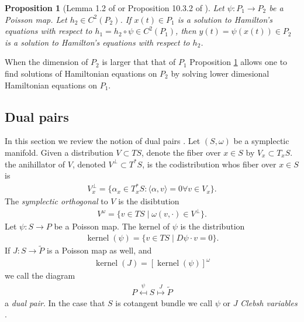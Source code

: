 \documentclass[12pt]{amsart}
\newtheorem{prop}[thm]{Proposition}
\DeclareMathOperator{\kernel}{kernel}
\begin{document}
\begin{prop}[Lemma 1.2 of \cite{Weinstein1983} or Proposition 10.3.2 of \cite{MandS}] \label{prop:Poisson_dynamics}
  Let $\psi:P_1 \to P_2$ be a Poisson map.
  Let $h_2 \in C^2(P_2)$.
  If $x(t) \in P_1$ is a solution to Hamilton's equations with respect
  to $h_1 = h_2 \circ \psi \in C^2(P_1)$, then $y(t) = \psi(x(t)) \in P_2$ is a solution
  to Hamilton's equations with respect to $h_2$.
\end{prop}

  When the dimension of $P_2$ is larger that that of $P_1$
  Proposition \ref{prop:Poisson_dynamics} allows one to find solutions of
  Hamiltonian equations on $P_2$
  by solving lower dimesional Hamiltonian equations
  on $P_1$.
  \subsection{Dual pairs}
  In this section we review the notion of dual pairs
  \cite{MarsdenWeinstein1983,Weinstein1983,Gay-BalmazVizman2011}.
  Let $(S,\omega)$ be a symplectic manifold.
  Given a distribution $V \subset TS$, denote the fiber over 
  $x \in S$ by $V_x \subset T_x S$.
  the anihillator of $V$, denoted $V^\perp \subset T^*S$, is the
  codistribution whos fiber over $x \in S$ is
  \begin{align*}
    V_x^\perp = \{ \alpha_x \in T_x^*S : \langle \alpha , v \rangle = 0 \forall v \in V_x  \}.
  \end{align*}
  The \emph{symplectic orthogonal} to $V$ is the disibtution
  \begin{align*}
    V^\omega = \{ v \in TS \mid \omega( v , \cdot ) \in V^\perp \}.
  \end{align*}
  Let $\psi:S \to P$ be a Poisson map.
  The kernel of $\psi$ is the distribution
  \begin{align*}
    \kernel(\psi) = \{ v \in TS \mid D\psi \cdot v  = 0 \}.
  \end{align*}
  If $J:S \to \tilde{P}$ is a Poisson map as well, and
  \begin{align*}
    \kernel(J) =  [\kernel(\psi) ]^\omega
  \end{align*}
  we call the diagram
  \begin{align*}
    P \stackrel{\psi}{\mapsfrom} S \stackrel{J}{\mapsto} \tilde{P}
  \end{align*}
  a \emph{dual pair}.
  In the case that $S$ is cotangent bundle we call $\psi$ or $J$
  \emph{Clebsh variables} \cite{MarsdenWeinstein1983}.
\end{document}
